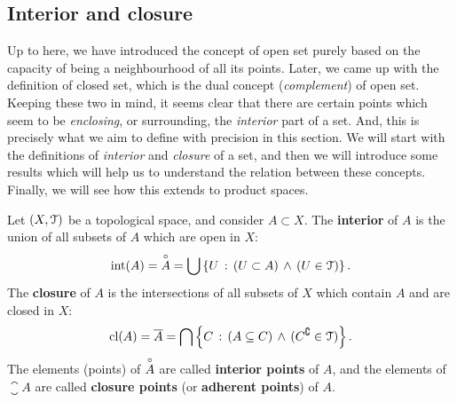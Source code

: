 \subsection{Interior and closure}\label{subsec:interior-closure}

Up to here, we have introduced the concept of open set purely based on the capacity of being a neighbourhood of all its points. Later, we came up with the definition of closed set, which is the dual concept (\emph{complement}) of open set. Keeping these two in mind, it seems clear that there are certain points which seem to be \emph{enclosing}, or surrounding, the \emph{interior} part of a set. And, this is precisely what we aim to define with precision in this section. We will start with the definitions of \emph{interior} and \emph{closure} of a set, and then we will introduce some results which will help us to understand the relation between these concepts. Finally, we will see how this extends to product spaces.

\begin{definition}
	\label{def:interior-closure}
	Let $(X,\EuScript{T})$ be a topological space, and consider $A\subset X$.
	The \textbf{interior} of $A$ is the union of all subsets of $A$ which are open in $X$:
	\[\mathrm{int}(A)=\overset{\circ}{A}=\bigcup\left\{U\,:\,(U\subset A)\,\land\,(U\in\EuScript{T})\right\}.\]
	The \textbf{closure} of $A$ is the intersections of all subsets of $X$ which contain $A$ and are closed in $X$:
	\[\mathrm{cl}(A)=\overline{A}=\bigcap\left\{C\,:\,(A\subseteq C)\,\land\,(C^\complement\in\EuScript{T})\right\}.\]
	The elements (points) of $\overset{\circ}{A}$ are called \textbf{interior points} of $A$, and the elements of $\closure{A}$ are called \textbf{closure points} (or \textbf{adherent points}) of $A$.
\end{definition}


